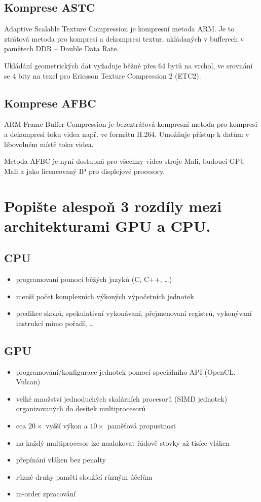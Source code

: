 	\subsection*{Komprese ASTC}
		Adaptive Scalable Texture Compression je kompresní metoda ARM. Je to ztrátová metoda pro kompresi a dekompresi textur, ukládaných v bufferech v pamětech DDR – Double Data Rate.
		
		Ukládání geometrických dat vyžaduje běžně přes 64 bytů na vrchol, ve srovnání se 4 bity na texel pro Ericsson Texture Compression 2 (ETC2).

	\subsection*{Komprese AFBC}
		ARM Frame Buffer Compression je bezeztrátová kompresní metoda pro kompresi a dekompresi toku videa např. ve formátu H.264. Umožňuje přístup k datům v libovolném místě toku videa.
	
	Metoda AFBC je nyní dostupná pro všechny video stroje Mali, budoucí GPU Mali a jako licencovaný IP pro displejové procesory. 

	
	
\section{Popište alespoň 3 rozdíly mezi architekturami GPU a CPU.}
	\subsection*{CPU}
		\begin{itemize}
			\setlength\itemsep{0em}
			\item programovaní pomocí běžých jazyků (C, C++, \dots)
			\item menší počet komplexních výkoných výpočetních jednotek
			\item predikce skoků, spekulativní vykonávaní, přejmenovaní registrů, vykonývaní instrukcí mimo pořadí, \dots
		\end{itemize}
	\subsection*{GPU}
		\begin{itemize}
			\setlength\itemsep{0em}
			\item programování/konfigurace jednotek pomocí speciálního API (OpenCL, Vulcan)
			\item velké množství jednoduchých skalárních procesorů (SIMD jednotek) organizovaných do desítek multiprocesorů
			\item cca $20\times$ vyšší výkon a $10\times$ paměťová propustnost			
			\item na každý multiprocesor lze naalokovat řádově stovky až tisíce vláken
			\item přepínání vláken bez penalty
			\item různé druhy pamětí sloužící různým účelům
			\item in-order zpracování
		\end{itemize}
	

